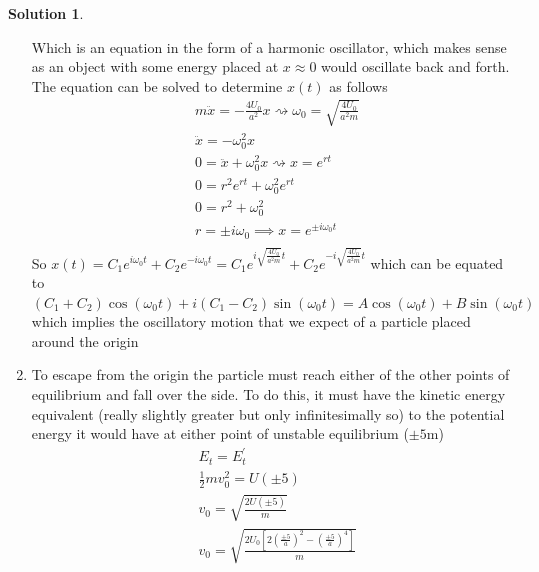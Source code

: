 \documentclass[10pt]{article}
\theoremstyle{definition}
\newtheorem{soln}{Solution}
\begin{document}
\begin{soln}
\begin{enumerate}[label=\alph*)]
                  Which is an equation in the form of a harmonic oscillator, which makes sense as an object with some energy placed at $x\approx 0$ would oscillate back and forth.
                  The equation can be solved to determine $x(t)$ as follows
                  \begin{align*}
                         & m\ddot{x}=-\frac{4U_0}{a^2}x\rightsquigarrow\omega_0=\sqrt{\frac{4U_0}{a^2m}} \\
                         & \ddot{x}=-\omega_0^2x                                                         \\
                         & 0=\ddot{x}+\omega_0^2x\rightsquigarrow x=e^{rt}                               \\
                         & 0=r^2e^{rt}+\omega_0^2e^{rt}                                                  \\
                         & 0=r^2+\omega_0^2                                                              \\
                         & r=\pm i\omega_0 \implies x=e^{\pm i\omega_0 t}                                \\
                  \end{align*}
                  So $x(t)=\displaystyle C_1e^{i\omega_0 t}+C_2e^{-i\omega_0 t}=C_1e^{i\sqrt{\frac{4U_0}{a^2m}} t}+C_2e^{-i\sqrt{\frac{4U_0}{a^2m}} t}$ which can be equated to
                  $(C_1+C_2)\cos(\omega_0 t)+i(C_1-C_2)\sin(\omega_0 t)=A\cos(\omega_0 t)+B\sin(\omega_0 t)$ which implies the oscillatory motion that we expect of a particle placed around the origin
            \item To escape from the origin the particle must reach either of the other points of equilibrium and fall over the side. To do this, it must have the kinetic energy equivalent (really slightly greater but only infinitesimally so)
            to the potential energy it would have at either point of unstable equilibrium ($\pm5\unit{\meter}$)
            \begin{align*}
                  & E_t=E_t^\prime\\
                  & \frac{1}{2}mv_0^2=U(\pm5) \\
                  & v_0=\sqrt{\frac{2U(\pm5)}{m}} \\
                  & v_0=\sqrt{\frac{2U_0\left[2\left(\frac{\pm5}{a}\right)^2-\left(\frac{\pm5}{a}\right)^4\right]}{m}} \\
            \end{align*}
      \end{enumerate}
\end{soln}
\end{document}
